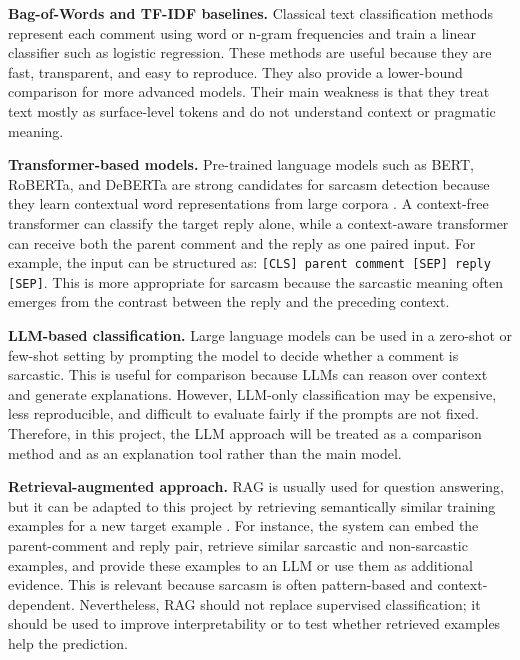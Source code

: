 \documentclass[%
 reprint,
 amsmath,amssymb,
 aps,
]{revtex4-2}
\begin{document}
\textbf{Bag-of-Words and TF-IDF baselines.} Classical text classification methods represent each comment using word or n-gram frequencies and train a linear classifier such as logistic regression. These methods are useful because they are fast, transparent, and easy to reproduce. They also provide a lower-bound comparison for more advanced models. Their main weakness is that they treat text mostly as surface-level tokens and do not understand context or pragmatic meaning.

\textbf{Transformer-based models.} Pre-trained language models such as BERT, RoBERTa, and DeBERTa are strong candidates for sarcasm detection because they learn contextual word representations from large corpora \cite{devlin2019bert,liu2019roberta}. A context-free transformer can classify the target reply alone, while a context-aware transformer can receive both the parent comment and the reply as one paired input. For example, the input can be structured as: \texttt{[CLS] parent comment [SEP] reply [SEP]}. This is more appropriate for sarcasm because the sarcastic meaning often emerges from the contrast between the reply and the preceding context.

\textbf{LLM-based classification.} Large language models can be used in a zero-shot or few-shot setting by prompting the model to decide whether a comment is sarcastic. This is useful for comparison because LLMs can reason over context and generate explanations. However, LLM-only classification may be expensive, less reproducible, and difficult to evaluate fairly if the prompts are not fixed. Therefore, in this project, the LLM approach will be treated as a comparison method and as an explanation tool rather than the main model.

\textbf{Retrieval-augmented approach.} RAG is usually used for question answering, but it can be adapted to this project by retrieving semantically similar training examples for a new target example \cite{lewis2020retrieval}. For instance, the system can embed the parent-comment and reply pair, retrieve similar sarcastic and non-sarcastic examples, and provide these examples to an LLM or use them as additional evidence. This is relevant because sarcasm is often pattern-based and context-dependent. Nevertheless, RAG should not replace supervised classification; it should be used to improve interpretability or to test whether retrieved examples help the prediction.
\end{document}
